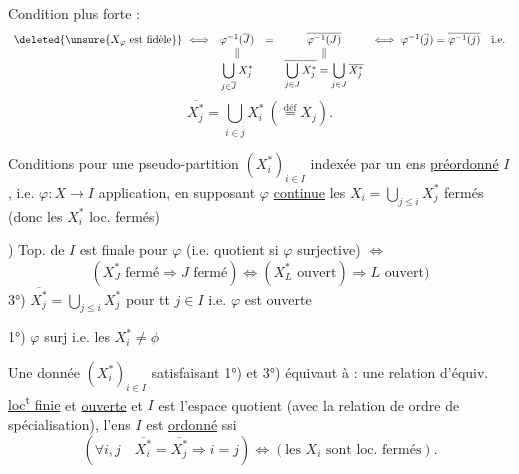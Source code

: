 Condition plus forte : 
\[
\begin{array}{rclcl}
\deleted{\unsure{X_\varphi\text{ est fidèle}}}\ \Longleftrightarrow&
\varphi^{-1}(\overline J)&=&\overline{\varphi^{-1}(J)}&
\Longleftrightarrow\ \varphi^{-1}(\overline j)=\overline{\varphi^{-1}(j)}\quad\text{i.e.}\\
&\Vert&&\Vert&\\
&\displaystyle\bigcup_{j\in\overline J}X_j^*&&
\displaystyle\overline{\bigcup_{j\in J}X_j^*}=\bigcup_{j\in J}\overline{X_j^*}&
\end{array}
\]
\[
\overline{X_j^*}=\bigcup_{i\in\overline j}X_i^*\ (\overset{\mathrm{déf}}=X_j).
\]

Conditions pour une pseudo-partition $(X_i^*)_{i\in I}$  indexée par un ens
\uline{préordonné} $I$, i.e. $\varphi:X\longrightarrow I$ application, en supposant $\varphi$ \uline{continue}
 les $X_i=\bigcup_{j\leq i}X_j^*$ fermés (donc les $X_i^*$ loc. fermés)

) Top. de $I$ est finale pour $\varphi$ (i.e. quotient si $\varphi$ surjective) $\Longleftrightarrow$
\[
(X_J^*\text{ fermé}\Rightarrow J\text{ fermé})\Longleftrightarrow
(X_L^*\text{ ouvert})\Rightarrow L\text{ ouvert})
\]
3°) $\overline{X_j^*}=\bigcup_{j\leq i}X_j^*$ pour tt $j\in I$ i.e. $\varphi$ est ouverte

1°) $\varphi$ surj i.e. les $X_i^*\ne\phi$

Une donnée $(X_i^*)_{i\in I}$ satisfaisant 1°) et 3°) équivaut à
 : une relation d'équiv. \uline{loc\textsuperscript{t} finie} et \uline{ouverte}
et $I$ est l'espace quotient (avec la relation de ordre
de spécialisation),  l'ens $I$ est \uline{ordonné} ssi
\[
(\forall i,j\quad\overline{X_i^*}=\overline{X_j^*}\Rightarrow i=j)
\Longleftrightarrow(\text{les }X_i\text{ sont loc. fermés}).
\]

